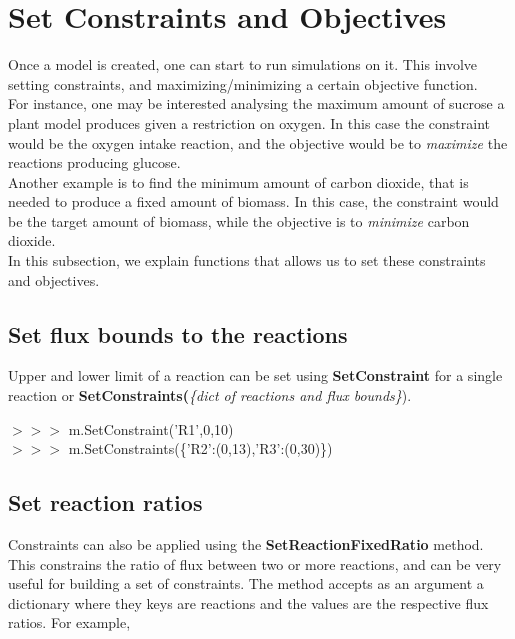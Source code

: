 \section{Set Constraints and Objectives}
Once a model is created, one can start to run simulations on it. This involve setting constraints, and maximizing/minimizing a certain objective function.\\ 

For instance, one may be interested analysing the maximum amount of sucrose a plant model produces given a restriction on oxygen. In this case the constraint would be the oxygen intake reaction, and the objective would be to \textit{maximize} the reactions producing glucose. \\ 

Another example is to find the minimum amount of carbon dioxide, that is needed to produce a fixed amount of biomass. In this case, the constraint would be the target amount of biomass, while the objective is to \textit{minimize} carbon dioxide. \\ 

In this subsection, we explain functions that allows us to set these constraints and objectives.

\subsection{Set flux bounds to the reactions}
Upper and lower limit of a reaction can be set using \textbf{SetConstraint} for a single reaction or \textbf{SetConstraints(}\textit{\{dict of reactions and flux bounds\}}).

\begin{framed}
$>>>$ m.SetConstraint('R1',0,10)\\
$>>>$ m.SetConstraints(\{'R2':(0,13),'R3':(0,30)\})
\end{framed}

 \subsection{Set reaction ratios}
 
Constraints can also be applied using the \textbf{SetReactionFixedRatio} method. This constrains the ratio of flux between two or more reactions, and can be very useful for building a set of constraints. The method accepts as an argument a dictionary where they keys are reactions and the values are the respective flux ratios. For example,

